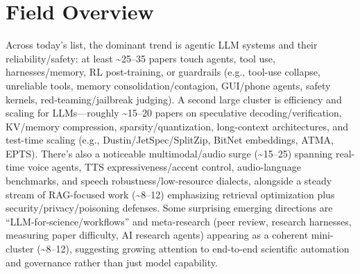 \documentclass[12pt,letterpaper]{article}
\begin{document}
\section*{Field Overview}
{\footnotesize Across today's list, the dominant trend is agentic LLM systems and their reliability/safety: at least \textasciitilde{}25--35 papers touch agents, tool use, harnesses/memory, RL post-training, or guardrails (e.g., tool-use collapse, unreliable tools, memory consolidation/contagion, GUI/phone agents, safety kernels, red-teaming/jailbreak judging). A second large cluster is efficiency and scaling for LLMs---roughly \textasciitilde{}15--20 papers on speculative decoding/verification, KV/memory compression, sparsity/quantization, long-context architectures, and test-time scaling (e.g., Dustin/JetSpec/SplitZip, BitNet embeddings, ATMA, EPTS). There's also a noticeable multimodal/audio surge (\textasciitilde{}15--25) spanning real-time voice agents, TTS expressiveness/accent control, audio-language benchmarks, and speech robustness/low-resource dialects, alongside a steady stream of RAG-focused work (\textasciitilde{}8--12) emphasizing retrieval optimization plus security/privacy/poisoning defenses. Some surprising emerging directions are ``LLM-for-science/workflows'' and meta-research (peer review, research harnesses, measuring paper difficulty, AI research agents) appearing as a coherent mini-cluster (\textasciitilde{}8--12), suggesting growing attention to end-to-end scientific automation and governance rather than just model capability.}
\end{document}
